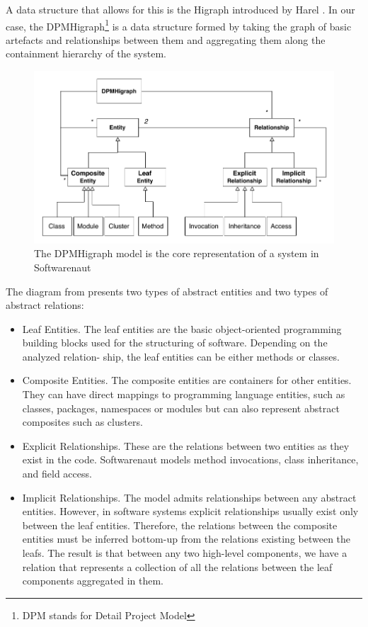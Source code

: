 \documentclass[preprint,12pt]{elsarticle}
\begin{document}
A data structure that allows for this is the Higraph introduced by Harel \cite{harel-visform}. In our case, the DPMHigraph\footnote{DPM stands for Detail Project Model} is a data structure formed by taking the graph of basic artefacts and relationships between them and aggregating them along the containment hierarchy of the system. 

\begin{figure}[h]
\begin{center}
\includegraphics[width=0.7\linewidth]{HigraphModel}
\caption{The DPMHigraph model is the core representation of a system in Softwarenaut}
\end{center}
\end{figure}


The diagram from  presents two types of abstract entities and two types of abstract relations:
\begin{itemize}
\item Leaf Entities. The leaf entities are the basic object-oriented programming building blocks used for the structuring of software. Depending on the analyzed relation- ship, the leaf entities can be either methods or classes.
\item Composite Entities. The composite entities are containers for other entities. They can have direct mappings to programming language entities, such as classes, packages, namespaces or modules but can also represent abstract composites such as clusters.
\item Explicit Relationships. These are the relations between two entities as they exist in the code. Softwarenaut models method invocations, class inheritance, and field access.
\item Implicit Relationships. The model admits relationships between any abstract entities. However, in software systems explicit relationships usually exist only between the leaf entities. Therefore, the relations between the composite entities must be inferred bottom-up from the relations existing between the leafs. The result is that between any two high-level components, we have a relation that represents a collection of all the relations between the leaf components aggregated in them.
\end{itemize}
\end{document}
